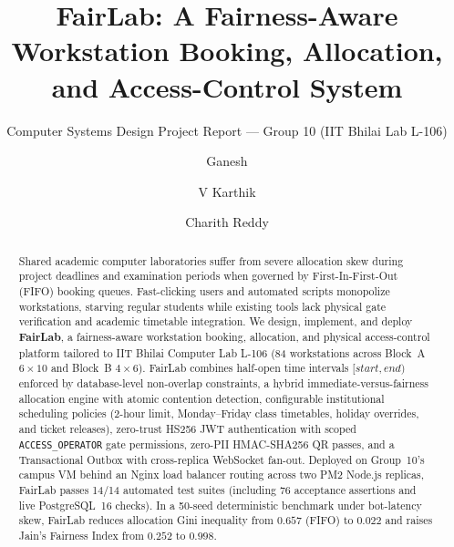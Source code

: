 \documentclass[manuscript,screen,review]{acmart}
\begin{document}
\title{FairLab: A Fairness-Aware Workstation Booking, Allocation, and Access-Control System}
\subtitle{Computer Systems Design Project Report --- Group 10 (IIT Bhilai Lab L-106)}

\author{Ganesh}

\author{V Karthik}

\author{Charith Reddy}

\renewcommand{\shortauthors}{Ganesh, V Karthik, and Charith Reddy}

\begin{abstract}
Shared academic computer laboratories suffer from severe allocation skew during project deadlines and examination periods when governed by First-In-First-Out (FIFO) booking queues. Fast-clicking users and automated scripts monopolize workstations, starving regular students while existing tools lack physical gate verification and academic timetable integration. We design, implement, and deploy \textbf{FairLab}, a fairness-aware workstation booking, allocation, and physical access-control platform tailored to IIT Bhilai Computer Lab L-106 (84 workstations across Block~A $6\times 10$ and Block~B $4\times 6$). FairLab combines half-open time intervals $[start, end)$ enforced by database-level non-overlap constraints, a hybrid immediate-versus-fairness allocation engine with atomic contention detection, configurable institutional scheduling policies (2-hour limit, Monday--Friday class timetables, holiday overrides, and ticket releases), zero-trust HS256 JWT authentication with scoped \texttt{ACCESS\_OPERATOR} gate permissions, zero-PII HMAC-SHA256 QR passes, and a Transactional Outbox with cross-replica WebSocket fan-out. Deployed on Group~10's campus VM behind an Nginx load balancer routing across two PM2 Node.js replicas, FairLab passes 14/14 automated test suites (including 76 acceptance assertions and live PostgreSQL~16 checks). In a 50-seed deterministic benchmark under bot-latency skew, FairLab reduces allocation Gini inequality from $0.657$ (FIFO) to $0.022$ and raises Jain's Fairness Index from $0.252$ to $0.998$.
\end{abstract}
\end{document}
